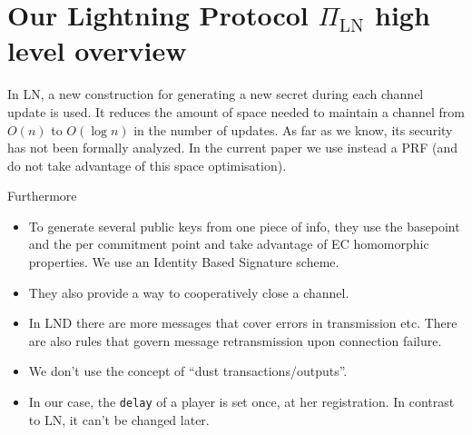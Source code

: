 \section{Our Lightning Protocol $\Pi_{\mathrm{LN}}$ high level overview}

  \begin{remark}

    In LN, a new construction for generating a new secret during each channel
    update is used. It reduces the amount of space needed to maintain a channel
    from $O(n)$ to $O(\log n)$ in the number of updates. As far as we know, its
    security has not been formally analyzed. In the current paper we use instead
    a PRF (and do not take advantage of this space optimisation).

    Furthermore 
    \begin{itemize}
      \item To generate several public keys from one piece of info, they use the
      basepoint and the per commitment point and take advantage of EC homomorphic
      properties. We use an Identity Based Signature scheme.
      \item They also provide a way to cooperatively close a channel.
      \item In LND there are more messages that cover errors in transmission etc.
      There are also rules that govern message retransmission upon connection
      failure.
      \item We don't use the concept of ``dust transactions/outputs''.
      \item In our case, the \texttt{delay} of a player is set once, at her
      registration. In contrast to LN, it can't be changed later.
    \end{itemize}
  \end{remark}

